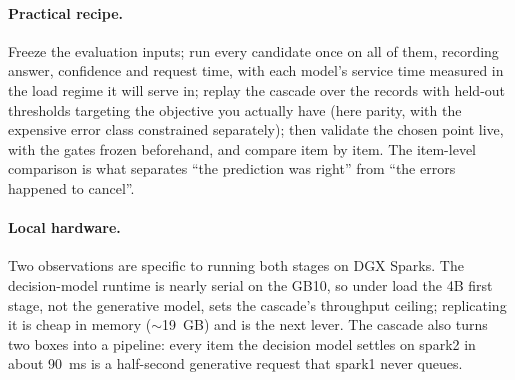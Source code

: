 \documentclass[11pt]{article}
\begin{document}
\paragraph{Practical recipe.} Freeze the evaluation inputs; run every candidate once on all of them,
recording answer, confidence and request time, with each model's service time measured in the load
regime it will serve in; replay the cascade over the records with held-out thresholds targeting the
objective you actually have (here parity, with the expensive error class constrained separately);
then validate the chosen point live, with the gates frozen beforehand, and compare item by item.
The item-level comparison is what separates ``the prediction was right'' from ``the errors
happened to cancel''.

\paragraph{Local hardware.} Two observations are specific to running both stages on DGX Sparks.
The decision-model runtime is nearly serial on the GB10, so under load the 4B first stage, not the
generative model, sets the cascade's throughput ceiling; replicating it is cheap in memory
($\sim$19~GB) and is the next lever. The cascade also turns two boxes into a pipeline: every item the
decision model settles on spark2 in about 90~ms is a half-second generative request that spark1
never queues.
\end{document}
